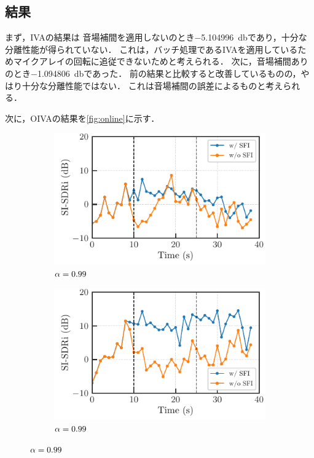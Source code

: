 \documentclass{article}
\begin{document}
\subsection{結果}
まず，IVAの結果は
音場補間を適用しないのとき\SI[round-mode=places,round-precision=3]{-5.104996}{\decibel}であり，十分な分離性能が得られていない．
これは，バッチ処理であるIVAを適用しているためマイクアレイの回転に追従できないためと考えられる．
次に，音場補間ありのとき\SI[round-mode=places,round-precision=3]{-1.094806}{\decibel}であった．
前の結果と比較すると改善しているものの，やはり十分な分離性能ではない．
これは音場補間の誤差によるものと考えられる．

次に，OIVAの結果を\cref{fig:online}に示す．
\begin{figure}[t]
  \centering
  \begin{subfigure}[t]{\linewidth}
    \includegraphics{figures/plots/online/Gauss_8000_97.pdf}
    \caption{$\alpha = 0.99$}
  \end{subfigure}
  \begin{subfigure}[t]{\linewidth}
    \includegraphics{figures/plots/online/Gauss_8000_99.pdf}
    \caption{$\alpha = 0.99$}
  \end{subfigure}

\end{figure}
\end{document}
